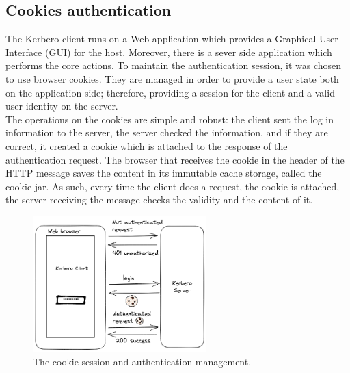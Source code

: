 \subsection{Cookies authentication}
The Kerbero client runs on a Web application which provides a Graphical User Interface (GUI) for the host. Moreover, there is a sever side application which performs the core actions. To maintain the authentication session, it was chosen to use browser cookies. They are managed in order to provide a user state both on the application side; therefore, providing a session for the client and a valid user identity on the server. 
\\ The operations on the cookies are simple and robust: the client sent the log in information to the server, the server checked the information, and if they are correct, it created a cookie which is attached to the response of the authentication request. The browser that receives the cookie in the header of the HTTP message saves the content in its immutable cache storage, called the cookie jar. As such, every time the client does a request, the cookie is attached, the server receiving the message checks the validity and the content of it.
\begin{figure}[ht]
    \centering
    \includegraphics[width=0.6\textwidth]{figures/cookiesflow.excalidraw.png}
    \caption{The cookie session and authentication management.}
    \label{fig:cookieflow}
\end{figure}

